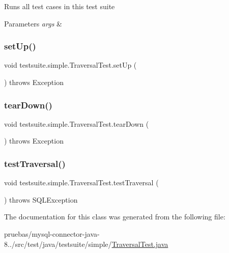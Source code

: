 Runs all test cases in this test suite


\begin{DoxyParams}{Parameters}
{\em args} & \\
\hline
\end{DoxyParams}
\mbox{\label{classtestsuite_1_1simple_1_1_traversal_test_a4715980c14675baf75ed7cbbacc2f7b5}} 
\subsubsection{\texorpdfstring{set\+Up()}{setUp()}}
{\footnotesize\ttfamily void testsuite.\+simple.\+Traversal\+Test.\+set\+Up (\begin{DoxyParamCaption}{ }\end{DoxyParamCaption}) throws Exception}

\mbox{\label{classtestsuite_1_1simple_1_1_traversal_test_a8f7344c09351c45f90dd4b8b9be3be40}} 
\subsubsection{\texorpdfstring{tear\+Down()}{tearDown()}}
{\footnotesize\ttfamily void testsuite.\+simple.\+Traversal\+Test.\+tear\+Down (\begin{DoxyParamCaption}{ }\end{DoxyParamCaption}) throws Exception}

\mbox{\label{classtestsuite_1_1simple_1_1_traversal_test_a7a7160b9550ff25b80370eed85097efb}} 
\subsubsection{\texorpdfstring{test\+Traversal()}{testTraversal()}}
{\footnotesize\ttfamily void testsuite.\+simple.\+Traversal\+Test.\+test\+Traversal (\begin{DoxyParamCaption}{ }\end{DoxyParamCaption}) throws S\+Q\+L\+Exception}



The documentation for this class was generated from the following file\+:\begin{DoxyCompactItemize}
\item 
pruebas/mysql-\/connector-\/java-\/8../src/test/java/testsuite/simple/\mbox{\hyperlink{_traversal_test_8java}{Traversal\+Test.\+java}}\end{DoxyCompactItemize}
